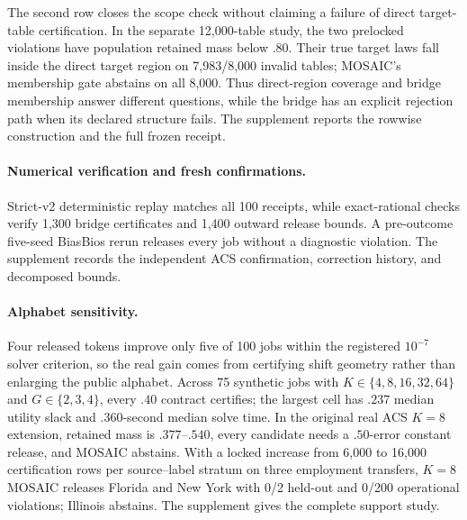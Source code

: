The second row closes the scope check without claiming a failure of direct
target-table certification. In the separate 12,000-table study, the two
prelocked violations have population retained mass below $.80$. Their true
target laws fall inside the direct target region on 7,983/8,000 invalid tables;
MOSAIC's membership gate abstains on all 8,000. Thus direct-region coverage and
bridge membership answer different questions, while the bridge has an explicit
rejection path when its declared structure fails. The supplement reports the
rowwise construction and the full frozen receipt.

\paragraph{Numerical verification and fresh confirmations.}
Strict-v2 deterministic replay matches all 100 receipts, while exact-rational
checks verify 1,300 bridge certificates and 1,400 outward release bounds. A
pre-outcome five-seed BiasBios rerun releases every job without a diagnostic
violation. The supplement records the independent ACS confirmation, correction
history, and decomposed bounds.



\paragraph{Alphabet sensitivity.}
Four released tokens improve only five of 100 jobs within the registered
$10^{-7}$ solver criterion, so the real gain comes from certifying shift
geometry rather than enlarging the public alphabet. Across 75 synthetic jobs
with $K\in\{4,8,16,32,64\}$ and $G\in\{2,3,4\}$, every $.40$ contract
certifies; the largest cell has $.237$ median utility slack and $.360$-second
median solve time. In the original real ACS $K=8$ extension, retained mass is
$.377$--$.540$, every candidate needs a $.50$-error constant release, and
MOSAIC abstains. With a locked increase from 6,000 to 16,000 certification
rows per source--label stratum on three employment transfers, $K=8$ MOSAIC
releases Florida and New York with 0/2 held-out and 0/200 operational
violations; Illinois abstains. The supplement gives the complete support study.
